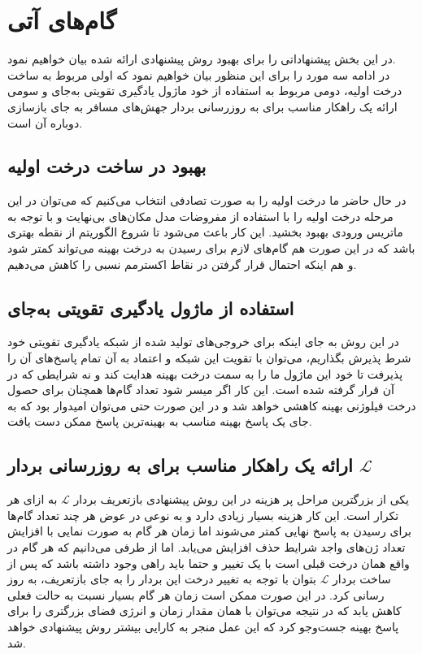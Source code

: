   
\section{گام‌های آتی}
در این بخش پیشنهاداتی را برای بهبود روش پیشنهادی ارائه شده بیان خواهیم نمود.\\
در ادامه سه مورد را برای این منظور بیان خواهیم نمود که اولی مربوط به ساخت درخت اولیه، دومی مربوط به استفاده از خود ماژول یادگیری تقویتی به‌جای  و سومی ارائه یک راهکار مناسب برای به روزرسانی بردار جهش‌های مسافر به جای بازسازی دوباره آن است.


\subsection{بهبود در ساخت درخت اولیه}
در حال حاضر ما درخت اولیه را به صورت تصادفی انتخاب می‌کنیم که می‌توان در این مرحله درخت اولیه را با استفاده از مفروضات مدل مکان‌های بی‌نهایت و با توجه به ماتریس ورودی بهبود بخشید. این کار باعث می‌شود تا شروع الگوریتم از نقطه بهتری باشد که در این صورت هم گام‌های لازم برای رسیدن به درخت بهینه می‌تواند کمتر شود و هم اینکه احتمال قرار گرفتن در نقاط اکسترمم نسبی را کاهش می‌دهیم.


\subsection{استفاده از ماژول یادگیری تقویتی به‌جای  }
در این روش به جای اینکه برای خروجی‌های تولید شده از شبکه یادگیری تقویتی خود شرط پذیرش بگذاریم، می‌توان با تقویت این شبکه و اعتماد به آن تمام پاسخ‌های آن را پذیرفت تا خود این ماژول ما را به سمت درخت بهینه هدایت کند و نه شرایطی که در آن قرار گرفته شده است. این کار اگر میسر شود تعداد گام‌ها همچنان برای حصول درخت فیلوژنی بهینه کاهشی خواهد شد و در این صورت حتی می‌توان امیدوار بود که به جای یک پاسخ بهینه مناسب به بهینه‌ترین پاسخ ممکن دست یافت.

\subsection{ ارائه یک راهکار مناسب برای به روزرسانی بردار $\mathcal{L}$}
یکی از بزرگترین مراحل پر هزینه در این روش پیشنهادی بازتعریف بردار $\mathcal{L}$ به ازای هر تکرار است. این کار هزینه بسیار زیادی دارد و به نوعی در عوض هر چند تعداد گام‌ها برای رسیدن به پاسخ نهایی کمتر می‌شوند اما زمان هر گام به صورت نمایی با افزایش تعداد ژن‌های واجد شرایط حذف افزایش می‌یابد. اما از طرفی می‌دانیم که هر گام در واقع همان درخت قبلی است با یک تغییر و حتما باید راهی وجود داشته باشد که پس از ساخت بردار $\mathcal{L}$ بتوان با توجه به تغییر درخت این بردار را به جای بازتعریف، به روز رسانی کرد. در این صورت ممکن است زمان هر گام بسیار نسبت به حالت فعلی کاهش یابد که در نتیجه می‌توان با همان مقدار زمان و انرژی فضای بزرگتری را برای پاسخ بهینه جست‌وجو کرد که این عمل منجر به کارایی بیشتر روش پیشنهادی خواهد شد.
